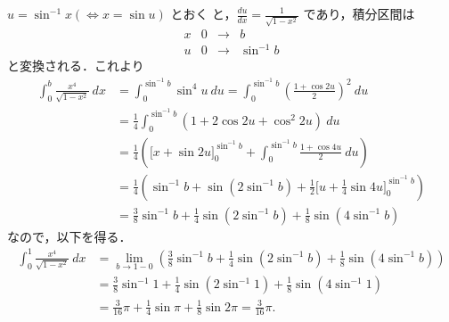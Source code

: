 \documentclass[11pt, uplatex, dvipdfmx]{jsarticle}
\newcommand{\ds}{\displaystyle}
\begin{document}
\begin{enumerate}[(1)]
     $u=\sin^{-1}x \left( \Leftrightarrow x=\sin u\right)$ とおく
     と，$\ds \frac{du}{dx} = \frac{1}{\sqrt{1-x^2}}$ であり，積分区間は
     \[
       \begin{array}{c|ccc}
         x & 0 & \to & b\\ \hline
         u & 0 & \to & \sin^{-1}b
       \end{array}
     \]
     と変換される．これより
     \begin{align*}
       \int_{0}^{b} \frac{x^4}{\sqrt{1-x^2}} \ dx 
       &= \int_{0}^{\sin^{-1}b} \sin^4 u \ du
       =\int_{0}^{\sin^{-1}b} \left( \frac{1+\cos 2u}{2}\right)^2 \ du\\
       & = \frac{1}{4}\int_{0}^{\sin^{-1}b} \left( 1+ 2 \cos 2u + \cos^2 2u\right) \ du\\
       &=\frac{1}{4} \left( \Big[ x + \sin 2u \Big]_{0}^{\sin^{-1}b} 
         + \int_{0}^{\sin^{-1}b} \frac{1+\cos 4u}{2} \ du\right)\\
       &= \frac{1}{4} \left( \sin^{-1}b + \sin \left(2 \sin^{-1}b\right)
         + \frac{1}{2}\Big[ u+\frac{1}{4}\sin 4u\Big]_{0}^{\sin^{-1}b} \right)\\
       &= \frac{3}{8} \sin^{-1}b + \frac{1}{4} \sin\left(2\sin^{-1}b\right) + \frac{1}{8}\sin\left(4\sin^{-1}b\right)
     \end{align*}
     なので，以下を得る．
     \begin{align*}
       \int_{0}^{1} \frac{x^4}{\sqrt{1-x^2}} \ dx 
       &= \lim_{b \to 1-0}\left( \frac{3}{8}\sin^{-1}b + \frac{1}{4} \sin\left(2\sin^{-1}b\right) 
       + \frac{1}{8}\sin\left(4\sin^{-1}b\right) \right)\\
       &=\frac{3}{8} \sin^{-1}1 + \frac{1}{4} \sin\left(2 \sin^{-1}1\right) + \frac{1}{8}\sin\left(4\sin^{-1}1\right)\\
       &= \frac{3}{16}\pi + \frac{1}{4}\sin \pi + \frac{1}{8}\sin 2\pi=\frac{3}{16}\pi.
     \end{align*}
     
   \end{enumerate}
\end{document}
